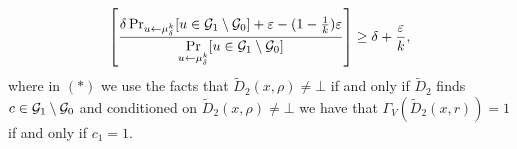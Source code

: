 \begin{align*}
  \left[\frac{\delta \Pr_{u \leftarrow \mu_{\delta}^{k}}[u \in \mathcal{G}_1 \setminus \mathcal{G}_0] + \varepsilon  - (1 - \frac{1}{k})\varepsilon}
  {\underset{u \leftarrow \mu_{\delta}^{k}}{\Pr}[u \in \mathcal{G}_1 \setminus \mathcal{G}_0]}\right] \geq \delta + \frac{\varepsilon}{k},
\end{align*}
where in $(*)$ we use the facts that $\widetilde{D}_2(x,\rho) \neq \bot$ if and only if $\widetilde{D}_2$ finds $c \in \mathcal{G}_1 \setminus \mathcal{G}_0$
and conditioned on $\widetilde{D}_2(x,\rho) \neq \bot$  we have that $\Gamma_V(\widetilde{D}_2(x,r)) = 1$ if and only if $c_1 = 1$.